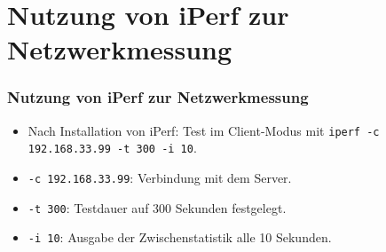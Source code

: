 \documentclass{beamer}
\begin{document}
\section{Nutzung von iPerf zur Netzwerkmessung}
\begin{frame}
    \frametitle{Nutzung von iPerf zur Netzwerkmessung}
    \begin{itemize}
        \item Nach Installation von iPerf: Test im Client-Modus mit \texttt{iperf -c 192.168.33.99 -t 300 -i 10}.
        \item \texttt{-c 192.168.33.99}: Verbindung mit dem Server.
        \item \texttt{-t 300}: Testdauer auf 300 Sekunden festgelegt.
        \item \texttt{-i 10}: Ausgabe der Zwischenstatistik alle 10 Sekunden.
    \end{itemize}
\end{frame}
\end{document}
